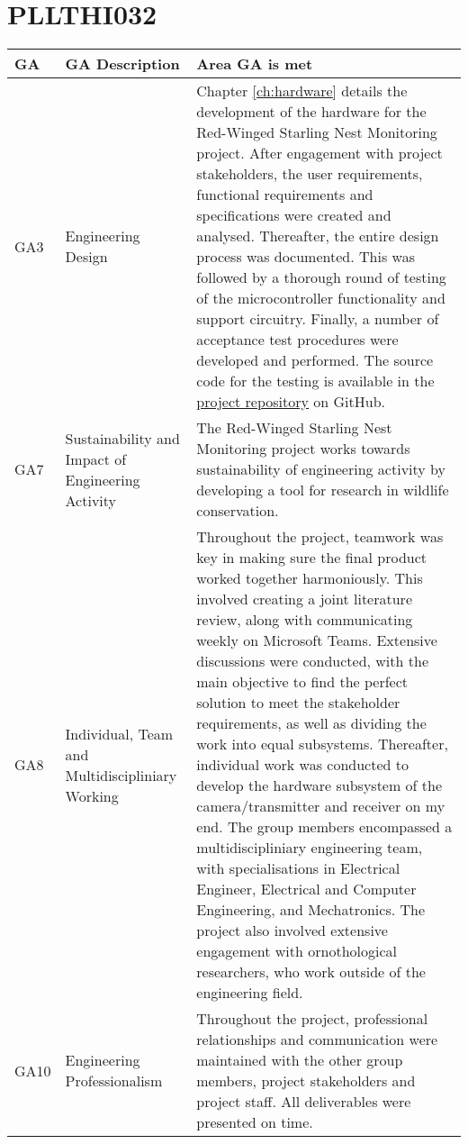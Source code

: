 \documentclass[class=report,11pt,crop=false]{standalone}
\begin{document}
\section{PLLTHI032}

\centering
\begin{tabularx}{\textwidth}{|p{} p{} X|}

    \hline
    \textbf{GA} & \textbf{GA Description} & \textbf{Area GA is met} \\ \hline

    GA3 & Engineering Design & Chapter \ref{ch:hardware} details the development of the hardware for the Red-Winged Starling Nest Monitoring project. After engagement with project stakeholders, the user requirements, functional requirements and specifications were created and analysed. Thereafter, the entire design process was documented. This was followed by a thorough round of testing of the microcontroller functionality and support circuitry. Finally, a number of acceptance test procedures were developed and performed. The source code for the testing is available in the \href{https://github.com/rothdu/EEE4113F-Group13-2024}{project repository} on GitHub. \\ \hline

    GA7 & Sustainability and Impact of Engineering Activity & The Red-Winged Starling Nest Monitoring project works towards sustainability of engineering activity by developing a tool for research in wildlife conservation. \\ \hline

    GA8 & Individual, Team and Multidiscipliniary Working & Throughout the project, teamwork was key in making sure the final product worked together harmoniously. This involved creating a joint literature review, along with communicating weekly on Microsoft Teams. Extensive discussions were conducted, with the main objective to find the perfect solution to meet the stakeholder requirements, as well as dividing the work into equal subsystems. Thereafter, individual work was conducted to develop the hardware subsystem of the camera/transmitter and receiver on my end. The group members encompassed a multidiscipliniary engineering team, with specialisations in Electrical Engineer, Electrical and Computer Engineering, and Mechatronics. The project also involved extensive engagement with ornothological researchers, who work outside of the engineering field. \\ \hline

    GA10 & Engineering Professionalism & Throughout the project, professional relationships and communication were maintained with the other group members, project stakeholders and project staff. All deliverables were presented on time. \\ \hline


\end{tabularx}
\raggedright

\ifstandalone

\printnoidxglossary[type=\acronymtype,nonumberlist]
\fi
\end{document}
